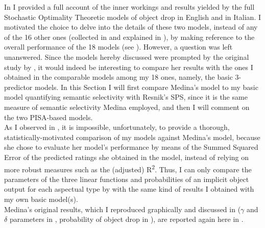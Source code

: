In  I provided a full account of the inner workings and results yielded by the full Stochastic Optimality Theoretic models of object drop in English and in Italian. I motivated the choice to delve into the details of these two models, instead of any of the 16 other ones (collected in  and explained in ), by making reference to the overall performance of the 18 models (see ). However, a question was left unanswered. Since the models hereby discussed were prompted by the original study by \textcite{Medina2007}, it would indeed be interesting to compare her results with the ones I obtained in the comparable models among my 18 ones, namely, the basic 3-predictor models. In this Section I will first compare Medina's model to my basic model quantifying semantic selectivity with Resnik's SPS, since it is the same measure of semantic selectivity Medina employed, and then I will comment on the two PISA-based models.\\
As I observed in , it is impossible, unfortunately, to provide a thorough, statistically-motivated comparison of my models against Medina's model, because she chose to evaluate her model's performance by means of the Summed Squared Error of the predicted ratings she obtained in the model, instead of relying on more robust measures such as the (adjusted) R\textsuperscript{2}. Thus, I can only compare the parameters of the three linear functions and probabilities of an implicit object output for each aspectual type by \textcite[143-144]{Medina2007} with the same kind of results I obtained with my own basic model(s).\\
Medina's original results, which I reproduced graphically and discussed in  ($\gamma$ and $\delta$ parameters in , probability of object drop in ), are reported again here in  .


